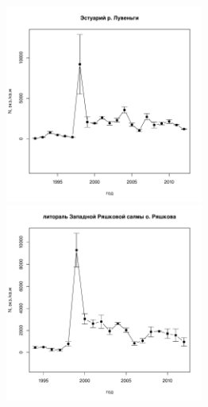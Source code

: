 \documentclass[12pt, a4paper]{article}
\begin{document}
\begin{figure}[h]
\begin{minipage}[b]{.46\linewidth}
\begin{center}
\includegraphics[width=65mm]{../White_Sea/Estuatiy_Luvenga/N_dynamic.pdf}
\end{center}
\end{minipage}
%
\hfil %
%
\begin{minipage}[b]{.46\linewidth}
\begin{center}
\includegraphics[width=65mm]{../White_Sea/Ryashkov_ZRS/N_dynamic.pdf}
\end{center}
\end{minipage}



\end{figure}
\end{document}
